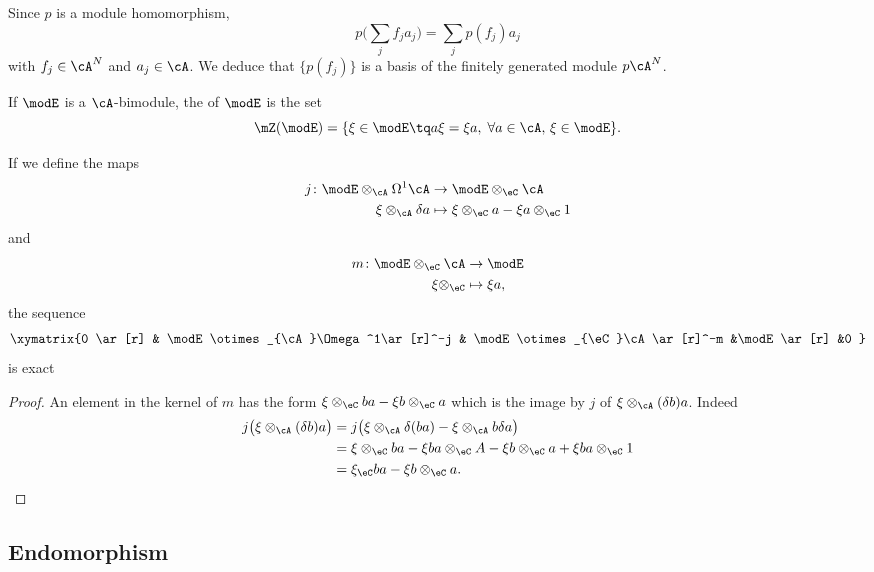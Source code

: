 Since $p$ is a module homomorphism,
\[ 
  p\big( \sum_{j}f_ja_j \big)=\sum_j p(f_j)a_j
\]
with $f_j\in\cA^N$ and $a_j\in\cA$. We deduce that $\{ p(f_j) \}$ is a basis of the finitely generated module $p\cA^N$.

If $\modE$ is a $\cA$-bimodule, the  of $\modE$ is the set
\begin{equation}
\mZ(\modE)=\{ \xi\in\modE\tq a\xi=\xi a,\;\forall a\in\cA,\,\xi\in\modE \}.
\end{equation}

\begin{proposition}
If we define the maps
\begin{equation}
\begin{aligned}
 j\colon \modE\otimes_{\cA}\Omega^1\cA&\to \modE\otimes_{\eC}\cA \\ 
   \xi\otimes_{\cA}\delta a&\mapsto \xi\otimes_{\eC}a-\xi a\otimes_{\eC}1 
\end{aligned}
\end{equation}
and
\begin{equation}
\begin{aligned}
 m\colon \modE\otimes_{\eC}\cA&\to \modE \\ 
   \xi\otimes_{\eC}&\mapsto \xi a, 
\end{aligned}
\end{equation}
the sequence
\[ 
\xymatrix{%
   0 \ar[r]		&	\modE\otimes_{\cA}\Omega^1\ar[r]^-j	&  \modE\otimes_{\eC}\cA\ar[r]^-m	&\modE\ar[r]	&0
}
\]
is exact
\end{proposition}

\begin{proof}
An element in the kernel of $m$ has the form $\xi\otimes_{\eC}ba-\xi b\otimes_{\eC}a$ which is the image by $j$ of $\xi\otimes_{\cA}(\delta b)a$. Indeed
\begin{align*}
j\big( \xi\otimes_{\cA}(\delta b)a \big)	&=j\big( \xi\otimes_{\cA}\delta(ba)-\xi\otimes_{\cA}b\delta a \big)\\
						&=\xi\otimes_{\eC}ba-\xi ba\otimes_{\eC}A-\xi b\otimes_{\eC}a+\xi ba\otimes_{\eC}1\\
						&=\xi_{\eC}ba-\xi b\otimes_{\eC} a.
\end{align*}
\end{proof}

\subsection{Endomorphism}

